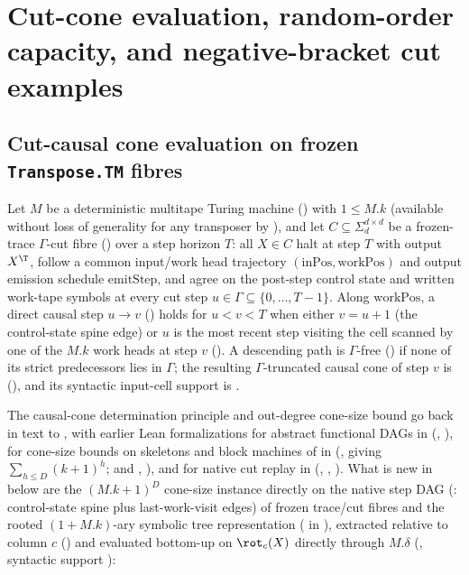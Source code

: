 \section{Cut-cone evaluation, random-order capacity, and negative-bracket cut examples}\label{sec:sweep}

\subsection{Cut-causal cone evaluation on frozen \texttt{Transpose.TM} fibres}\label{sec:sweep-trees}

Let $M$ be a deterministic multitape Turing machine () with $1 \le M.k$
(available without loss of generality for any transposer by ), and let
$C \subseteq \Sigma_d^{d\times d}$ be a frozen-trace $\Gamma$-cut fibre
() over a step horizon $T$: all $X \in C$ halt at step $T$ with output
$X^{\T}$, follow a common input/work head trajectory $(\mathrm{inPos}, \mathrm{workPos})$ and output
emission schedule $\mathrm{emitStep}$, and agree on the post-step control state and written
work-tape symbols at every cut step $u \in \Gamma \subseteq \{0,\dots,T-1\}$. Along
$\mathrm{workPos}$, a direct causal step $u \to v$ () holds for $u < v < T$ when
either $v = u + 1$ (the control-state spine edge) or $u$ is the most recent step visiting the cell
scanned by one of the $M.k$ work heads at step $v$ (). A descending path is
$\Gamma$-free () if none of its strict predecessors lies in $\Gamma$; the
resulting $\Gamma$-truncated causal cone of step $v$ is  (),
and its syntactic input-cell support is .

The causal-cone determination principle and out-degree cone-size bound go back in text to
\cite[Lemma~4.4 and Corollary~4.5]{FourthPaper2026}, with earlier Lean formalizations for abstract
functional DAGs in \cite[Lemma~3.3(b)]{MergeDepth2026}
(, ), for cone-size bounds on
skeletons and block machines of  in \cite[Lemma~4.7(a)]{MergeDepth2026}
(,  giving
$\sum_{h \le D}(k+1)^h$; and ,
), and for native cut replay in \cite{AdaptiveTransfer2026}
(,
,
). What is new in  below are
the $(M.k + 1)^D$ cone-size instance directly on the native step DAG (: control-state
spine plus last-work-visit edges) of frozen trace/cut fibres and the rooted $(1 + M.k)$-ary
symbolic tree representation ( in ),
extracted relative to column $c$ () and evaluated bottom-up on $\rot_c(X)$
directly through $M.\delta$ (, syntactic support ):

